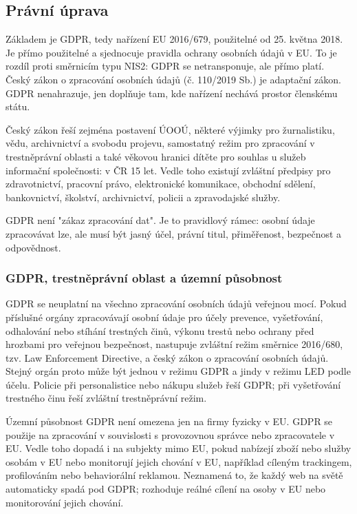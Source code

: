 \subsection*{Právní úprava}
Základem je GDPR, tedy nařízení EU 2016/679, použitelné od 25. května 2018. Je přímo použitelné a sjednocuje pravidla ochrany osobních údajů v EU. To je rozdíl proti směrnicím typu NIS2: GDPR se netransponuje, ale přímo platí. Český zákon o zpracování osobních údajů (č. 110/2019 Sb.) je adaptační zákon. GDPR nenahrazuje, jen doplňuje tam, kde nařízení nechává prostor členskému státu.

Český zákon řeší zejména postavení ÚOOÚ, některé výjimky pro žurnalistiku, vědu, archivnictví a svobodu projevu, samostatný režim pro zpracování v trestněprávní oblasti a také věkovou hranici dítěte pro souhlas u služeb informační společnosti: v ČR 15 let. Vedle toho existují zvláštní předpisy pro zdravotnictví, pracovní právo, elektronické komunikace, obchodní sdělení, bankovnictví, školství, archivnictví, policii a zpravodajské služby.

GDPR není "zákaz zpracování dat". Je to pravidlový rámec: osobní údaje zpracovávat lze, ale musí být jasný účel, právní titul, přiměřenost, bezpečnost a odpovědnost.

\subsubsection*{GDPR, trestněprávní oblast a územní působnost}
GDPR se neuplatní na všechno zpracování osobních údajů veřejnou mocí. Pokud příslušné orgány zpracovávají osobní údaje pro účely prevence, vyšetřování, odhalování nebo stíhání trestných činů, výkonu trestů nebo ochrany před hrozbami pro veřejnou bezpečnost, nastupuje zvláštní režim směrnice 2016/680, tzv. Law Enforcement Directive, a český zákon o zpracování osobních údajů. Stejný orgán proto může být jednou v režimu GDPR a jindy v režimu LED podle účelu. Policie při personalistice nebo nákupu služeb řeší GDPR; při vyšetřování trestného činu řeší zvláštní trestněprávní režim.

Územní působnost GDPR není omezena jen na firmy fyzicky v EU. GDPR se použije na zpracování v souvislosti s provozovnou správce nebo zpracovatele v EU. Vedle toho dopadá i na subjekty mimo EU, pokud nabízejí zboží nebo služby osobám v EU nebo monitorují jejich chování v EU, například cíleným trackingem, profilováním nebo behaviorální reklamou. Neznamená to, že každý web na světě automaticky spadá pod GDPR; rozhoduje reálné cílení na osoby v EU nebo monitorování jejich chování.

